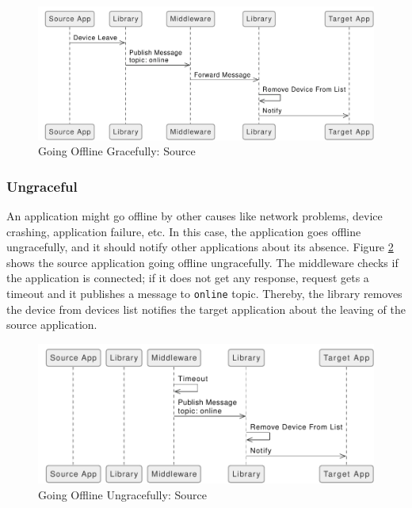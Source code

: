 \FloatBarrier \begin{figure}[H]
    \includegraphics[width=\linewidth]{../figures/Going-Offline-Graceful-Source}
    \centering
    \caption{Going Offline Gracefully: Source}
    \label{fig:Going-Offline-Graceful-Source}
\end{figure} \FloatBarrier

\subsubsection{Ungraceful}
An application might go offline by other causes like network problems, device crashing, application failure, etc. In this case, the application goes offline ungracefully, and it should notify other applications about its absence. Figure \ref{fig:Going-Offline-Ungraceful-Source} shows the source application going offline ungracefully. The middleware checks if the application is connected; if it does not get any response, request gets a timeout and it publishes a message to  \lstinline[basicstyle=\ttfamily]{online} topic. Thereby, the library removes the device from devices list notifies the target application about the leaving of the source application.

\FloatBarrier \begin{figure}[H]
    \includegraphics[width=\linewidth]{../figures/Going-Offline-Ungraceful-Source}
    \centering
    \caption{Going Offline Ungracefully: Source}
    \label{fig:Going-Offline-Ungraceful-Source}
\end{figure} \FloatBarrier

